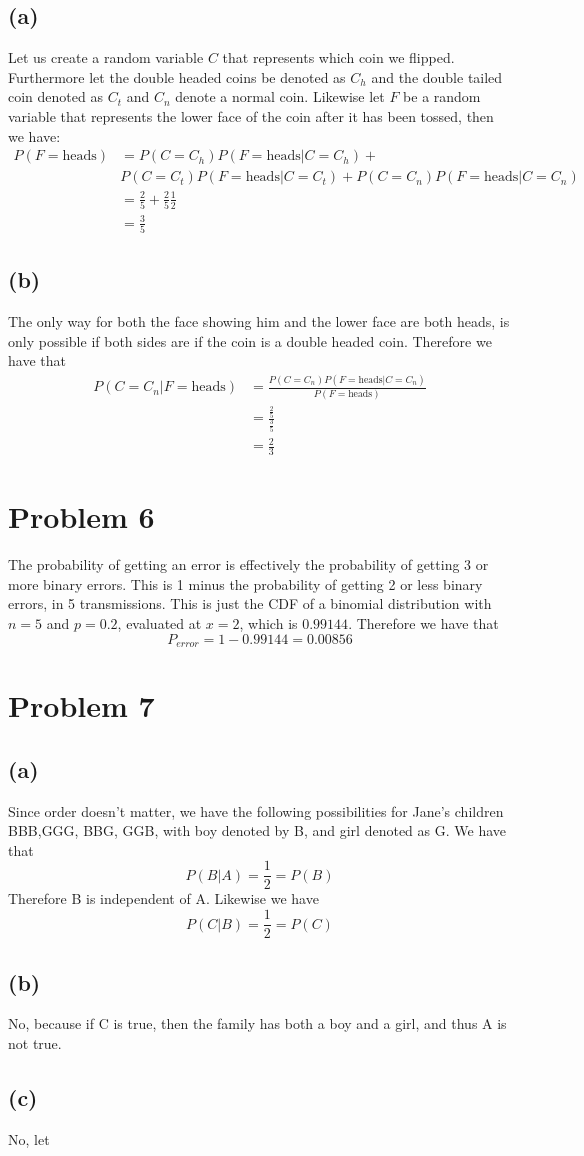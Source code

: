 \subsection*{(a)}
Let us create a random variable $C$ that represents which coin we flipped. Furthermore let the double headed coins be denoted as $C_h$ and the double tailed coin denoted as $C_t$
and $C_n$ denote a normal coin. Likewise let $F$ be a random variable that represents the lower face of the coin after it has been tossed, then we have:
\begin{align*}
    P(F=\text{heads})&=P(C=C_h)P(F=\text{heads}|C=C_h)+\\&P(C=C_t)P(F=\text{heads}|C=C_t)+P(C=C_n)P(F=\text{heads}|C=C_n)\\
    &=\frac{2}{5}+\frac{2}{5}\frac{1}{2}\\
    &=\boxed{\frac{3}{5}}
\end{align*}
\subsection*{(b)}
The only way for both the face showing him and the lower face are both heads, is only possible if both 
sides are if the coin is a double headed coin. Therefore we have that
\begin{align*}
    P(C=C_n|F=\text{heads})&=\frac{P(C=C_n)P(F=\text{heads}|C=C_n)}{P(F=\text{heads})}\\
    &=\frac{\frac{2}{5}}{\frac{3}{5}}\\
    &=\boxed{\frac{2}{3}}
\end{align*}
\section*{Problem 6}
The probability of getting an error is effectively the probability of getting 
3 or more binary errors. This is 1 minus the probability of getting 2 or less binary errors, in 5 transmissions. 
This is just the CDF of a binomial distribution with $n=5$ and $p=0.2$, evaluated at $x=2$, which is $0.99144$. Therefore we have that
$$P_{error}=1-0.99144=\boxed{0.00856}$$
\section*{Problem 7}
\subsection*{(a)}
Since order doesn't matter, we have the following possibilities for Jane's children
BBB,GGG, BBG, GGB, with boy denoted by B, and girl denoted as G. We have that
$$P(B|A)=\frac{1}{2}=P(B)$$
Therefore B is independent of A. Likewise we have
$$P(C|B)=\frac{1}{2}=P(C)$$
\subsection*{(b)}
No, because if C is true, then the family has both a boy and a girl, and thus
A is not true. 
\subsection*{(c)}
No, let 

